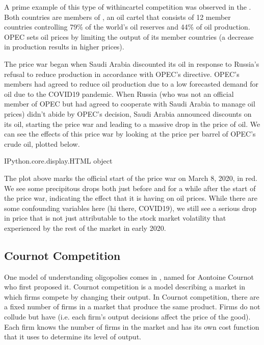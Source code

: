 \documentclass[letterpaper,10pt,english]{jupyterBook}
\begin{document}
\sphinxAtStartPar
A prime example of this type of within\sphinxhyphen{}cartel competition was observed in the . Both countries are members of , an oil cartel that consists of 12 member countries controlling 79\% of the world’s oil reserves and 44\% of oil production. OPEC sets oil prices by limiting the output of its member countries (a decrease in production results in higher prices).

\sphinxAtStartPar
The price war began when Saudi Arabia discounted its oil in response to Russia’s refusal to reduce production in accordance with OPEC’s directive. OPEC’s members had agreed to reduce oil production due to a low forecasted demand for oil due to the COVID\sphinxhyphen{}19 pandemic. When Russia (who was not an official member of OPEC but had agreed to cooperate with Saudi Arabia to manage oil prices) didn’t abide  by OPEC’s decision, Saudi Arabia announced discounts on its oil, starting the price war and leading to a massive drop in the price of oil. We can see the effects of this price war by looking at the price per barrel of OPEC’s crude oil, plotted below.

\begin{sphinxVerbatim}[commandchars=\\\{\}]
\PYGZlt{}IPython.core.display.HTML object\PYGZgt{}
\end{sphinxVerbatim}

\sphinxAtStartPar
The plot above marks the official start of the price war on March 8, 2020, in red. We see some precipitous drops both just before and for a while after the start of the price war, indicating the effect that it is having on oil prices. While there are some confounding variables here (hi there, COVID\sphinxhyphen{}19), we still see a serious drop in price that is not just attributable to the stock market volatility that experienced by the rest of the market in early 2020.


\subsection{Cournot Competition}
\label{\detokenize{content/07-game-theory/cournot:cournot-competition}}\label{\detokenize{content/07-game-theory/cournot::doc}}
\sphinxAtStartPar
One model of understanding oligopolies comes in , named for Aontoine Cournot who first proposed it. Cournot competition is a model describing a market in which firms compete by changing their output. In Cournot competition, there are a fixed number of firms in a market that produce the same product. Firms do not collude but have  (i.e. each firm’s output decisions affect the price of the good). Each firm knows the number of firms in the market and has its own cost function that it uses to determine its level of output.
\end{document}
